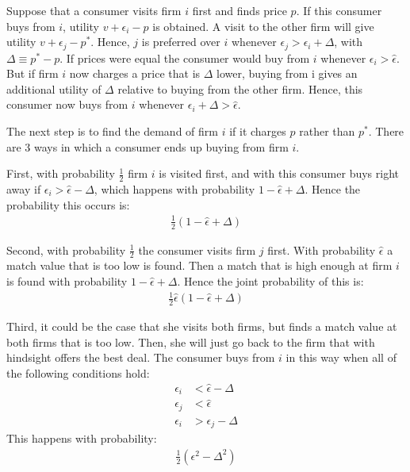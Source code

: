 Suppose that a consumer visits firm $i$ first and finds price $p$. If
this consumer buys from $i$, utility $v+\epsilon_i-p$ is obtained. A
visit to the other firm will give utility $v+\epsilon_j-p^*$. Hence,
$j$ is preferred over $i$ whenever $\epsilon_j>\epsilon_i+\Delta$, with
$\Delta\equiv p^*-p$.  If prices were equal the consumer would buy from $i$
whenever $\epsilon_i>\hat\epsilon$. But if firm $i$ now charges a price
that is $\Delta$ lower, buying from i gives an additional utility of
$\Delta$ relative to buying from the other firm. Hence, this consumer
now buys from $i$ whenever $\epsilon_i+\Delta>\hat\epsilon$.

The next step is to find the demand of firm $i$ if it charges $p$ rather
than $p^*$. There are 3 ways in which a consumer ends up buying from
firm $i$.

First, with probability $\frac{1}{2}$ firm $i$ is visited
first, and with this consumer buys right away if $\epsilon_i>\hat\epsilon-\Delta$,
which happens with probability $1-\hat\epsilon+\Delta$. Hence the
probability this occurs is:
\begin{align}
	\frac{1}{2}(1-\hat\epsilon+\Delta)
	\label{eq:ch2prob1}
\end{align}

Second, with probability $\frac{1}{2}$ the consumer visits firm $j$ first.
With probability $\hat\epsilon$ a match value that is too low is found.
Then a match that is high enough at firm $i$ is found with probability
$1-\hat\epsilon+\Delta$. Hence the joint probability of this is:
\begin{align}
	\frac{1}{2}\hat\epsilon(1-\hat\epsilon+\Delta)
	\label{eq:ch2prob2}
\end{align}

Third, it could be the case that she visits both firms, but finds a match value at both
firms that is too low. Then, she will just go back to the firm that with hindsight offers
the best deal. The consumer buys from $i$ in this way when all of the
following conditions hold:
\begin{align}
	\epsilon_i & <\hat\epsilon-\Delta \\
	\epsilon_j & <\hat\epsilon        \\
	\epsilon_i & >\epsilon_j-\Delta
\end{align}
This happens with probability:
\begin{align}
	\frac{1}{2}(\epsilon^2-\Delta^2)
	\label{eq:ch2prob3}
\end{align}

